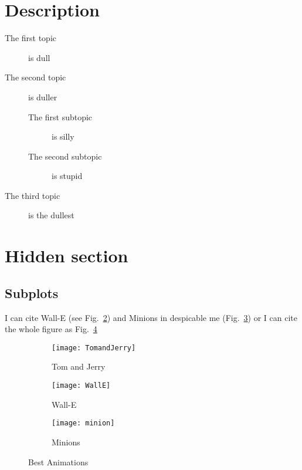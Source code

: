\section*{Description}
\begin{description}
\item[The first topic] is dull
\item[The second topic] is duller
\begin{description}
\item[The first subtopic] is silly
\item[The second subtopic] is stupid
\end{description}
\item[The third topic] is the dullest
\end{description}


\clearpage

\tochide\section{Hidden section}



\begin{landscape}

\section*{Subplots}
I can cite Wall-E (see Fig.~\ref{fig:WallE}) and Minions in despicable me (Fig.~\ref{fig:Minnion}) or I can cite the whole figure as Fig.~\ref{fig:animations}


\begin{figure}
  \centering
  \begin{subfigure}[b]{0.3\textwidth}
    \texttt{[image: TomandJerry]}
    \caption{Tom and Jerry}
    \label{fig:TomJerry}   
  \end{subfigure}             
  \begin{subfigure}[b]{0.3\textwidth}
    \texttt{[image: WallE]}
    \caption{Wall-E}
    \label{fig:WallE}
  \end{subfigure}             
  \begin{subfigure}[b]{0.3\textwidth}
    \texttt{[image: minion]}
    \caption{Minions}
    \label{fig:Minnion}
  \end{subfigure}
  \caption{Best Animations}
  \label{fig:animations}
\end{figure}


\end{landscape}
